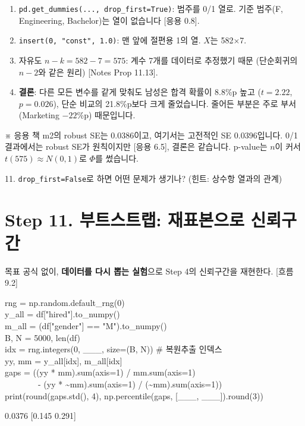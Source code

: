 \documentclass[11pt,a4paper]{article}
\newcommand{\code}[1]{\texttt{#1}}
\newcommand{\aside}[1]{{\footnotesize\color{black!65}#1}}
\newcommand{\Wc}[1]{{\scriptsize\textsf{\color{blue!60!black}[흐름 #1]}}}
\newcommand{\Hc}[1]{{\scriptsize\textsf{\color{orange!70!black}[응용 #1]}}}
\newcommand{\Nc}[1]{{\scriptsize\textsf{\color{violet!70!black}[Notes #1]}}}
\begin{document}
\begin{howbox}
\begin{enumerate}
\item \code{pd.get\_dummies(..., drop\_first=True)}: 범주를 0/1 열로. 기준 범주(F, Engineering, Bachelor)는 열이 없습니다 \Hc{0.8}.
\item \code{insert(0, "const", 1.0)}: 맨 앞에 절편용 1의 열. $X$는 582$\times$7.
\item 자유도 $n-k=582-7=575$: 계수 7개를 데이터로 추정했기 때문 (단순회귀의 $n-2$와 같은 원리) \Nc{Prop 11.13}.
\item \textbf{결론}: 다른 모든 변수를 같게 맞춰도 남성은 합격 확률이 8.8\%p 높고 ($t=2.22$, $p=0.026$), 단순 비교의 21.8\%p보다 크게 줄었습니다. 줄어든 부분은 주로 부서 (Marketing $-22$\%p) 때문입니다.
\end{enumerate}
\end{howbox}
\aside{※ 응용 책 m2의 robust SE는 0.0386이고, 여기서는 고전적인 SE 0.0396입니다. 0/1 결과에서는 robust SE가 원칙이지만 \Hc{6.5}, 결론은 같습니다. p-value는 $n$이 커서 $t(575)\approx N(0,1)$로 $\Phi$를 썼습니다.}

\begin{qbox}
11. \code{drop\_first=False}로 하면 어떤 문제가 생기나? (힌트: 상수항 열과의 관계)
\end{qbox}

\section{Step 11. 부트스트랩: 재표본으로 신뢰구간}
\begin{goalbox}{목표}
공식 없이, \textbf{데이터를 다시 뽑는 실험}으로 Step 4의 신뢰구간을 재현한다. \Wc{9.2}
\end{goalbox}

\begin{codebox}
rng = np.random.default\_rng(0)\\
y\_all = df["hired"].to\_numpy()\\
m\_all = (df["gender"] == "M").to\_numpy()\\
B, N = 5000, len(df)\\[3pt]
idx = rng.integers(0, \_\_\_, size=(B, N)) \hfill \# 복원추출 인덱스\\
yy, mm = y\_all[idx], m\_all[idx]\\
gaps = ((yy * mm).sum(axis=1) / mm.sum(axis=1)\\
\ \ \ \ \ \ \ \ - (yy * \textasciitilde mm).sum(axis=1) / (\textasciitilde mm).sum(axis=1))\\
print(round(gaps.std(), 4), np.percentile(gaps, [\_\_\_, \_\_\_]).round(3))
\end{codebox}
\begin{outbox}
0.0376 [0.145 0.291]
\end{outbox}
\end{document}
